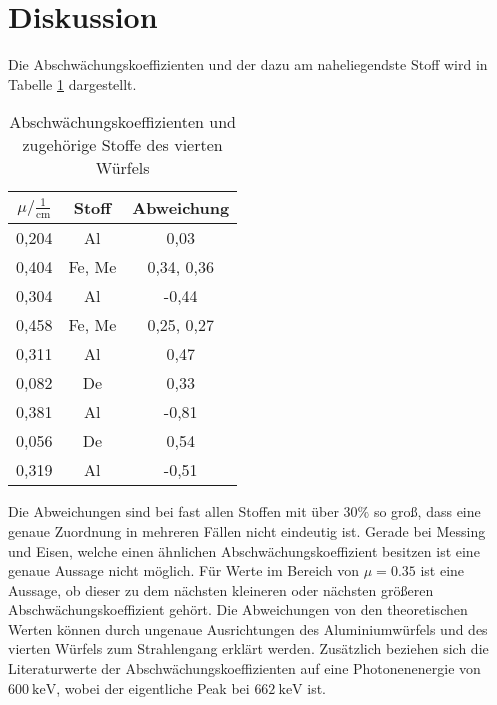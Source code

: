 \section{Diskussion}
\label{sec:Diskussion}

Die Abschwächungskoeffizienten und der dazu am naheliegendste Stoff wird in
Tabelle \ref{tab:abw} dargestellt.

\begin{table}[H]
  \centering
  \caption{Abschwächungskoeffizienten und zugehörige Stoffe des vierten Würfels}
  \label{tab:abw}
  \begin{tabular}{c c c}
    \toprule
    $\mu/ \mathrm{\frac{1}{cm}}$ & Stoff & Abweichung   \\
    \midrule
    0,204      &  Al     &   0,03    \\
    0,404      &  Fe, Me &   0,34, 0,36    \\
    0,304      &  Al     &  -0,44    \\
    0,458      &  Fe, Me &   0,25, 0,27    \\
    0,311      &  Al     &   0,47    \\
    0,082      &  De     &   0,33    \\
    0,381      &  Al     &  -0,81    \\
    0,056      &  De     &   0,54   \\
    0,319      &  Al     &  -0,51  \\
    \bottomrule
  \end{tabular}
\end{table}

Die Abweichungen sind bei fast allen Stoffen mit über $30\%$ so groß, dass
eine genaue Zuordnung in mehreren Fällen nicht eindeutig ist. Gerade bei Messing und
Eisen, welche einen ähnlichen Abschwächungskoeffizient besitzen ist eine genaue
Aussage nicht möglich. Für Werte im Bereich von $\mu = 0.35$ ist eine Aussage, ob
dieser zu dem nächsten kleineren oder nächsten größeren Abschwächungskoeffizient
gehört. Die Abweichungen von den theoretischen Werten können durch ungenaue Ausrichtungen des
Aluminiumwürfels und des vierten Würfels zum Strahlengang erklärt werden.
Zusätzlich beziehen sich die Literaturwerte der Abschwächungskoeffizienten auf
eine Photonenenergie von $\SI{600}{\kilo\eV}$, wobei der eigentliche Peak
bei $\SI{662}{\kilo\eV}$ ist.
